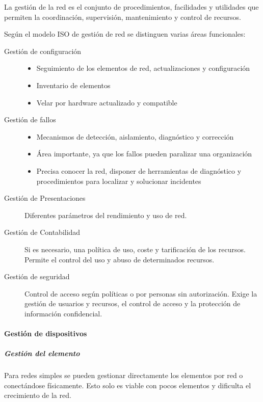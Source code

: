         La gestión de la red es el conjunto de procedimientos, facilidades y utilidades que permiten la coordinación, supervisión, mantenimiento y control de recursos.

        Según el modelo ISO de gestión de red se distinguen varias áreas funcionales:
        \begin{description}
            \item[Gestión de configuración]\begin{itemize}
                \item Seguimiento de los elementos de red, actualizaciones y configuración
                \item Inventario de elementos
                \item Velar por hardware actualizado y compatible
            \end{itemize}
            \item[Gestión de fallos] \begin{itemize}
                \item Mecanismos de detección, aislamiento, diagnóstico y corrección
                \item Área importante, ya que los fallos pueden paralizar una organización
                \item Precisa conocer la red, disponer de herramientas de diagnóstico y procedimientos para localizar y solucionar incidentes
            \end{itemize}
            \item[Gestión de Presentaciones] Diferentes parámetros del rendimiento y uso de red.
            \item[Gestión de Contabilidad] Si es necesario, una política de uso, coste y tarificación de los recursos. Permite el control del uso y abuso de determinados recursos.
            \item[Gestión de seguridad] Control de acceso según políticas o por personas sin autorización. Exige la gestión de usuarios y recursos, el control de acceso y la protección de información confidencial.
        \end{description}

        \paragraph{Gestión de dispositivos} %

            \subparagraph{Gestión del elemento} %
                Para redes simples se pueden gestionar directamente los elementos por red o conectándose físicamente. Esto solo es viable con pocos elementos y dificulta el crecimiento de la red.


